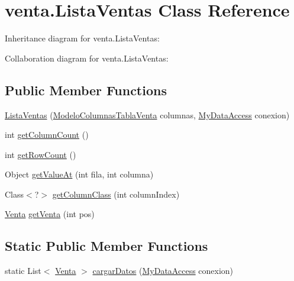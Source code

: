 \hypertarget{classventa_1_1_lista_ventas}{}\section{venta.\+Lista\+Ventas Class Reference}
\label{classventa_1_1_lista_ventas}


Inheritance diagram for venta.\+Lista\+Ventas\+:


Collaboration diagram for venta.\+Lista\+Ventas\+:
\subsection*{Public Member Functions}
\begin{DoxyCompactItemize}
\item 
\mbox{\hyperlink{classventa_1_1_lista_ventas_a69da326fde1b9ceea242d38147016528}{Lista\+Ventas}} (\mbox{\hyperlink{classventa_1_1_modelo_columnas_tabla_venta}{Modelo\+Columnas\+Tabla\+Venta}} columnas, \mbox{\hyperlink{classconexion_s_q_l_1_1_my_data_access}{My\+Data\+Access}} conexion)
\item 
int \mbox{\hyperlink{classventa_1_1_lista_ventas_a4c846805ce96ed90b2dc1228a2fc82c7}{get\+Column\+Count}} ()
\item 
int \mbox{\hyperlink{classventa_1_1_lista_ventas_a6c9b22b51a3571a01462073c6272cf0b}{get\+Row\+Count}} ()
\item 
Object \mbox{\hyperlink{classventa_1_1_lista_ventas_a49bbca6b55f15602ea06e0401ae84792}{get\+Value\+At}} (int fila, int columna)
\item 
Class$<$?$>$ \mbox{\hyperlink{classventa_1_1_lista_ventas_a285fad7c683f620c9320ee9d430975bd}{get\+Column\+Class}} (int column\+Index)
\item 
\mbox{\hyperlink{classventa_1_1_venta}{Venta}} \mbox{\hyperlink{classventa_1_1_lista_ventas_ae3dd8941eee7b0e14309add4764d3d1a}{get\+Venta}} (int pos)
\end{DoxyCompactItemize}
\subsection*{Static Public Member Functions}
\begin{DoxyCompactItemize}
\item 
static List$<$ \mbox{\hyperlink{classventa_1_1_venta}{Venta}} $>$ \mbox{\hyperlink{classventa_1_1_lista_ventas_a5addbb3cc5ae30ddd938cc5ae3021a48}{cargar\+Datos}} (\mbox{\hyperlink{classconexion_s_q_l_1_1_my_data_access}{My\+Data\+Access}} conexion)
\end{DoxyCompactItemize}


